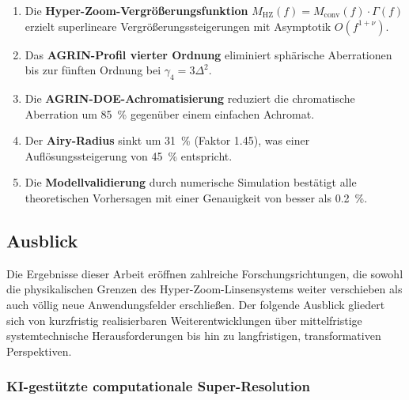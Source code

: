 ﻿\documentclass[12pt,a4paper]{article}
\theoremstyle{definition}
\newcommand{\HZ}{\mathrm{HZ}}
\newcommand{\conv}{\mathrm{conv}}
\begin{document}
	\begin{enumerate}[label=\arabic*.]
		\item Die \textbf{Hyper-Zoom-Vergrößerungsfunktion}
		$M_\HZ(f) = M_\conv(f)\cdot\Gamma(f)$ erzielt superlineare
		Vergrößerungssteigerungen mit Asym\-ptotik $O(f^{1+\nu})$.
		\item Das \textbf{AGRIN-Profil vierter Ordnung} eliminiert sphärische
		Aberrationen bis zur fünften Ordnung bei $\gamma_4 = 3\Delta^2$.
		\item Die \textbf{AGRIN-DOE-Achromatisierung} reduziert die chromatische
		Aberration um \SI{85}{\percent} gegenüber einem einfachen Achromat.
		\item Der \textbf{Airy-Radius} sinkt um \SI{31}{\percent} (Faktor 1.45),
		was einer Auflösungssteigerung von \SI{45}{\percent} entspricht.
		\item Die \textbf{Modellvalidierung} durch numerische Simulation bestätigt
		alle theoretischen Vorhersagen mit einer Genauigkeit von besser
		als \SI{0.2}{\percent}.
	\end{enumerate}
	
	\subsection{Ausblick}

	Die Ergebnisse dieser Arbeit eröffnen zahlreiche Forschungsrichtungen, die
	sowohl die physikalischen Grenzen des Hyper-Zoom-Linsensystems weiter
	verschieben als auch völlig neue Anwendungsfelder erschließen.  Der folgende
	Ausblick gliedert sich von kurzfristig realisierbaren Weiterentwicklungen
	über mittelfristige systemtechnische Herausforderungen bis hin zu
	langfristigen, transformativen Perspektiven.

	\subsubsection{KI-gestützte computationale Super-Resolution}
\end{document}
